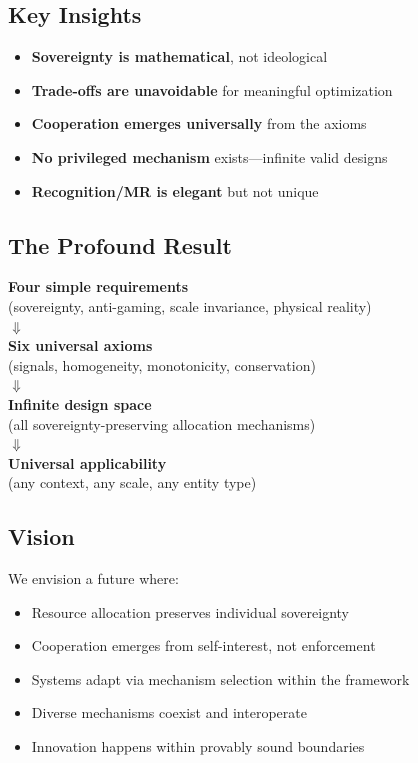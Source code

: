 \documentclass[11pt,a4paper]{article}
\theoremstyle{definition}
\theoremstyle{remark}
\begin{document}
\subsection{Key Insights}

\begin{itemize}
\item \textbf{Sovereignty is mathematical}, not ideological
\item \textbf{Trade-offs are unavoidable} for meaningful optimization
\item \textbf{Cooperation emerges universally} from the axioms
\item \textbf{No privileged mechanism} exists---infinite valid designs
\item \textbf{Recognition/MR is elegant} but not unique
\end{itemize}

\subsection{The Profound Result}

\begin{center}
\Large
\textbf{Four simple requirements} \\
\normalsize
(sovereignty, anti-gaming, scale invariance, physical reality) \\
\Large
$\Downarrow$ \\
\textbf{Six universal axioms} \\
\normalsize
(signals, homogeneity, monotonicity, conservation) \\
\Large
$\Downarrow$ \\
\textbf{Infinite design space} \\
\normalsize
(all sovereignty-preserving allocation mechanisms) \\
\Large
$\Downarrow$ \\
\textbf{Universal applicability} \\
\normalsize
(any context, any scale, any entity type)
\end{center}

\subsection{Vision}

We envision a future where:
\begin{itemize}
\item Resource allocation preserves individual sovereignty
\item Cooperation emerges from self-interest, not enforcement
\item Systems adapt via mechanism selection within the framework
\item Diverse mechanisms coexist and interoperate
\item Innovation happens within provably sound boundaries
\end{itemize}
\end{document}
